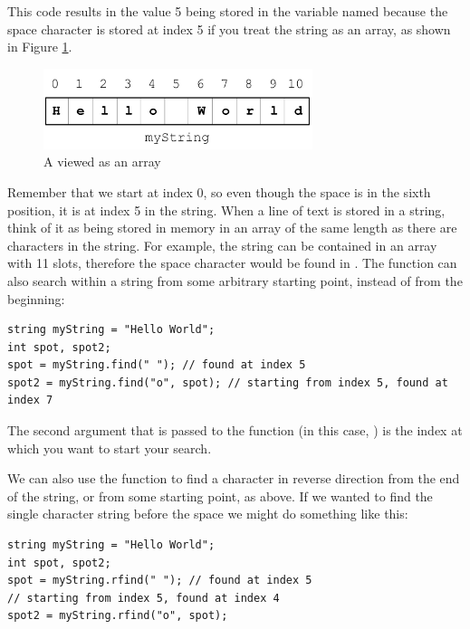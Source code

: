 This code results in the value 5 being stored in the variable named  because the space character is stored at index 5 if you treat the string as an array, as shown in Figure \ref{fig:string-diagram}.

\begin{figure}[tbh]
  \centering
  \includegraphics[width=0.7\textwidth]{diagrams/string-diagram.pdf}
  \caption{A  viewed as an array} \label{fig:string-diagram} 
\end{figure}

Remember that we start at index 0, so even though the space is in the sixth position, it is at index 5 in the string.
When a line of text is stored in a string, think of it as being stored in memory in an array of the same length as there are characters in the string.
For example, the string  can be contained in an array with 11 slots, therefore the space character would be found in .
The  function can also search within a string from some arbitrary starting point, instead of from the beginning:

\noindent\begin{minipage}{\linewidth}\begin{lstlisting}
string myString = "Hello World";
int spot, spot2;
spot = myString.find(" "); // found at index 5
spot2 = myString.find("o", spot); // starting from index 5, found at index 7
\end{lstlisting}\end{minipage}

\noindent The second argument that is passed to the function (in this case, ) is the index at which you want to start your search.

We can also use the  function to find a character in reverse direction from the end of the string, or from some starting point, as above.
If we wanted to find the single character string  before the space we might do something like this:

\noindent\begin{minipage}{\linewidth}\begin{lstlisting}
string myString = "Hello World";
int spot, spot2;
spot = myString.rfind(" "); // found at index 5
// starting from index 5, found at index 4
spot2 = myString.rfind("o", spot); 
\end{lstlisting}\end{minipage}

